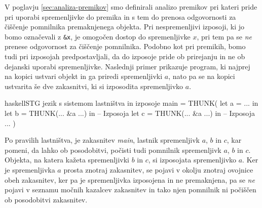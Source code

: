 

V poglavju \ref{sec:analiza-premikov} smo definirali analizo premikov pri kateri pride pri uporabi spremenljivke do premika in s tem do prenosa odgovornosti za čiščenje pomnilnika premaknjenega objekta. Pri nespremenljivi izposoji, ki jo bomo označevali z \texttt{\&x}, je omogočen dostop do spremenljivke $x$, pri tem pa se \emph{ne} prenese odgovornost za čiščenje pomnilnika. Podobno kot pri premikih, bomo tudi pri izposojah predpostavljali, da do izposoje pride ob prirejanju in ne ob dejanski uporabi spremenljivke. Naslednji primer prikazuje program, ki najprej na kopici ustvari objekt in ga priredi spremenljivki $a$, nato pa se na kopici ustvarita še dve zakasnitvi, ki si izposodita spremenljivko $a$.

\begin{code-box}{haskell}{STG jezik s sistemom lastništva in izposoje}
main = THUNK(
    let a = ... in
    let b = THUNK(... &a ...) in -- Izposoja
    let c = THUNK(... &a ...) in -- Izposoja
        ...
)
\end{code-box}

Po pravilih lastništva, je zakasnitev \textit{main}, lastnik spremenljivk $a$, $b$ in $c$, kar pomeni, da lahko ob posodobitvi, počisti tudi pomnilnik spremenljivk $a$, $b$ in $c$. Objekta, na katera kažeta spremenljivki $b$ in $c$, si izposojata spremenljivko $a$. Ker je spremenljivka $a$ prosta znotraj zakasnitev, se pojavi v okolju znotraj ovojnice obeh zakasnitev, ker pa je spremenljivka izposojena in ne premaknjena, pa se \emph{ne} pojavi v seznamu močnih kazalcev zakasnitev in tako njen pomnilnik ni počiščen ob posodobitvi zakasnitev.

